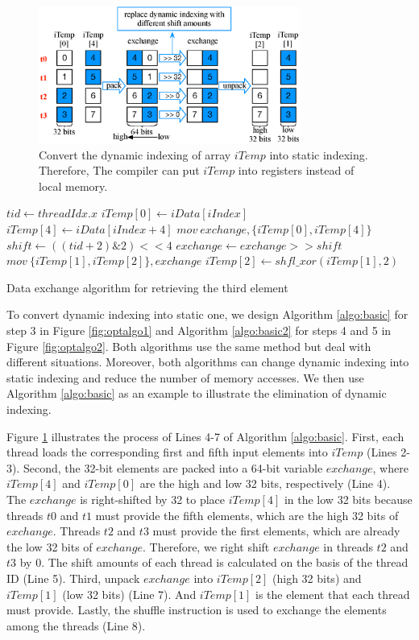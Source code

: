 \begin{figure}[t!]
	\centering
	\includegraphics[width=\columnwidth,height=4.5cm]{./figure/exchange.eps}
\caption{Convert the dynamic indexing of array $iTemp$ into static indexing. Therefore, The compiler can put $iTemp$ into registers instead of local memory.}
\label{fig:exchange}
\end{figure}


\begin{algorithm}[t!]
	$tid \gets threadIdx.x$\;
	$iTemp[0] \gets iData[iIndex]$\;
	$iTemp[4] \gets iData[iIndex+4]$\;
	$mov\ exchange, \{iTemp[0], iTemp[4]\}$\;
	$shift \gets ((tid+2)\&2)<<4$\;
	$exchange \gets exchange >> shift$\;
	$mov\ \{iTemp[1],iTemp[2]\}, exchange$\;
	$iTemp[2] \gets shfl\_xor(iTemp[1],2)$\;	
	
	\caption{Data exchange algorithm for retrieving the third element}
	\label{algo:basic}
\end{algorithm}

To convert dynamic indexing into static one, we design Algorithm \ref{algo:basic} for step 3 in Figure \ref{fig:optalgo1} and
Algorithm \ref{algo:basic2} for steps 4 and 5 in Figure \ref{fig:optalgo2}. Both algorithms use the same method but deal with different
situations. Moreover, both algorithms can change dynamic indexing into static indexing and reduce the number of memory accesses. We then use Algorithm
\ref{algo:basic} as an example to illustrate the elimination of dynamic indexing.

Figure \ref{fig:exchange} illustrates the process of Lines 4-7 of Algorithm \ref{algo:basic}. First, each thread loads the corresponding first and fifth input elements into $iTemp$ (Lines 2-3). Second, the 32-bit elements are packed into a 64-bit variable $exchange$, where $iTemp[4]$ and $iTemp[0]$ are the high and low 32 bits, respectively (Line 4). The $exchange$ is right-shifted by 32 to place $iTemp[4]$ in the low 32 bits because threads $t0$ and $t1$ must provide the fifth
elements, which are the high 32 bits of $exchange$. Threads $t2$ and $t3$ must provide the first elements, which are already the low 32 bits of $exchange$. Therefore, we right shift $exchange$ in threads $t2$ and $t3$ by 0. The shift amounts of each thread is calculated on the basis of the thread ID (Line 5). Third, unpack $exchange$ into $iTemp[2]$
(high 32 bits) and $iTemp[1]$ (low 32 bits) (Line 7). And $iTemp[1]$ is the element that each thread must provide. Lastly, the
shuffle instruction is used to exchange the elements among the threads (Line 8).

